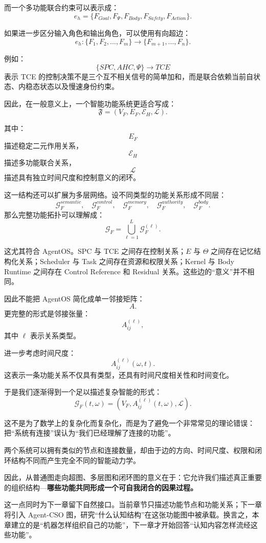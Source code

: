 而一个多功能联合约束可以表示成：
\[
e_h
=
\{
F_{Goal},
F_{\Psi},
F_{Body},
F_{Safety},
F_{Action}
\}.
\]

如果进一步区分输入角色和输出角色，可以使用有向超边：
\[
e_h:
\{F_1,F_2,\ldots,F_m\}
\rightarrow
\{F_{m+1},\ldots,F_n\}.
\]

例如：
\[
\{SPC,AHC,\Psi\}
\rightarrow
TCE
\]
表示 TCE 的控制决策不是三个互不相关信号的简单加和，而是联合依赖当前自状态、内稳态状态以及慢速身份约束。

因此，在一般意义上，一个智能功能系统更适合写成：
\[
\boxed{
\mathfrak F
=
(V_F,E_F,\mathcal E_H,\mathcal L).
}
\]

其中：
\[
E_F
\]
描述稳定二元作用关系，
\[
\mathcal E_H
\]
描述多功能联合关系，
\[
\mathcal L
\]
描述具有独立时间尺度和控制意义的闭环。

这一结构还可以扩展为多层网络。设不同类型的功能关系形成不同层：
\[
\mathcal G_F^{semantic},
\quad
\mathcal G_F^{control},
\quad
\mathcal G_F^{memory},
\quad
\mathcal G_F^{authority},
\quad
\mathcal G_F^{body}.
\]
那么完整功能拓扑可以理解成：
\[
\mathcal G_F
=
\bigcup_{\ell=1}^{L}
\mathcal G_F^{(\ell)}.
\]

这尤其符合 AgentOS。SPC 与 TCE 之间存在控制关系；$E$ 与 $\Theta$ 之间存在记忆结构化关系；Scheduler 与 Task 之间存在资源和权限关系；Kernel 与 Body Runtime 之间存在 Control Reference 和 Residual 关系。这些边的“意义”并不相同。

因此不能把 AgentOS 简化成单一邻接矩阵：
\[
A.
\]
更完整的形式是邻接张量：
\[
A_{ij}^{(\ell)},
\]
其中 $\ell$ 表示关系类型。

进一步考虑时间尺度：
\[
A_{ij}^{(\ell)}(\omega,t).
\]
这表示一条功能关系不仅具有类型，还具有时间尺度相关性和时间变化。

于是我们逐渐得到一个足以描述复杂智能的形式：
\[
\boxed{
\mathcal G_F(t,\omega)
=
\left(
V_F,
A_{ij}^{(\ell)}(t,\omega),
\mathcal L
\right).
}
\]

这不是为了数学上的复杂化而复杂化，而是为了避免一个非常常见的理论错误：把“系统有连接”误认为“我们已经理解了连接的功能”。

两个系统可以拥有类似的节点和连接数量，却由于边的方向、时间尺度、权限和闭环结构不同而产生完全不同的智能动力学。

因此，从普通图走向超图、多层图和闭环图的意义在于：它允许我们描述真正重要的组织结构---\textbf{哪些功能共同形成一个可自我闭合的因果过程。}

这一点同时为下一章留下自然接口。当前章节只描述功能节点和功能关系；下一章将引入 Agent-CSO 图，研究“什么认知结构”在这张功能图中被承载。换言之，本章建立的是“机器怎样组织自己的功能”，下一章才开始回答“认知内容怎样流经这些功能”。



